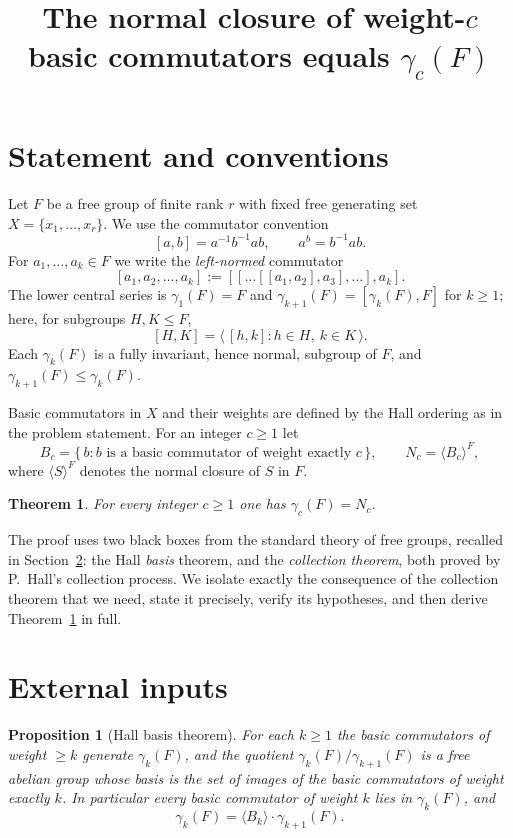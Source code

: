 \documentclass{amsart}
\newtheorem{theorem}{Theorem}
\newtheorem{proposition}{Proposition}
\theoremstyle{definition}
\theoremstyle{remark}
\begin{document}
\title{The normal closure of weight-$c$ basic commutators equals $\gamma_c(F)$}
\maketitle

\section{Statement and conventions}

Let $F$ be a free group of finite rank $r$ with fixed free generating set
$X=\{x_1,\dots,x_r\}$. We use the commutator convention
\[
[a,b]=a^{-1}b^{-1}ab ,\qquad a^{b}=b^{-1}ab .
\]
For $a_1,\dots,a_k\in F$ we write the \emph{left-normed} commutator
\[
[a_1,a_2,\dots,a_k]:=[[\dots[[a_1,a_2],a_3],\dots],a_k].
\]
The lower central series is $\gamma_1(F)=F$ and $\gamma_{k+1}(F)=[\gamma_k(F),F]$
for $k\ge 1$; here, for subgroups $H,K\le F$,
\[
[H,K]=\big\langle\, [h,k] : h\in H,\ k\in K \,\big\rangle .
\]
Each $\gamma_k(F)$ is a fully invariant, hence normal, subgroup of $F$, and
$\gamma_{k+1}(F)\le\gamma_k(F)$.

Basic commutators in $X$ and their weights are defined by the Hall ordering as in
the problem statement. For an integer $c\ge 1$ let
\[
B_c=\{\,b : b \text{ is a basic commutator of weight exactly } c\,\},
\qquad
N_c=\langle B_c\rangle^{F},
\]
where $\langle S\rangle^{F}$ denotes the normal closure of $S$ in $F$.

\begin{theorem}\label{thm:main}
For every integer $c\ge 1$ one has $\gamma_c(F)=N_c$.
\end{theorem}

The proof uses two black boxes from the standard theory of free groups, recalled
in Section~\ref{sec:input}: the Hall \emph{basis} theorem, and the
\emph{collection theorem}, both proved by P.\ Hall's collection process. We
isolate exactly the consequence of the collection theorem that we need, state it
precisely, verify its hypotheses, and then derive Theorem~\ref{thm:main} in full.

\section{External inputs}\label{sec:input}

\begin{proposition}[Hall basis theorem]\label{prop:hall}
For each $k\ge 1$ the basic commutators of weight $\ge k$ generate $\gamma_k(F)$,
and the quotient $\gamma_k(F)/\gamma_{k+1}(F)$ is a free abelian group whose basis
is the set of images of the basic commutators of weight exactly $k$. In
particular every basic commutator of weight $k$ lies in $\gamma_k(F)$, and
\begin{equation}\label{eq:hall-decomp}
\gamma_k(F)=\langle B_k\rangle\cdot\gamma_{k+1}(F).
\end{equation}
\end{proposition}
\end{document}
